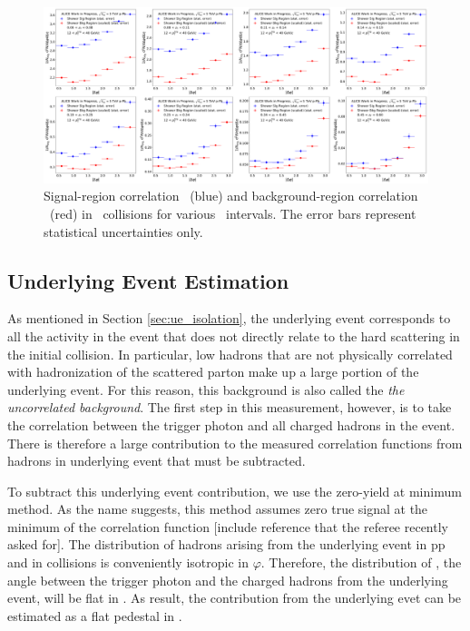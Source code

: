 \begin{figure}
    \centering
    \includegraphics[width = 1.0 \textwidth]{G-H_New/p-Pb_SR_BR_Overlay_pT_0.pdf}
    \caption{Signal-region correlation \CSR~(blue) and background-region correlation \CBR~(red) in \pPb~collisions for various \zt~intervals. The error bars represent statistical uncertainties only.}
    \label{fig:pPb_SR_BR_Overlay_pPb}
\end{figure}
\FloatBarrier


\subsection{Underlying Event Estimation}
\label{sec:ue_subtraction}
As mentioned in Section \ref{sec:ue_isolation}, the underlying event corresponds to all the activity in the event that does not directly relate to the hard scattering in the initial collision. In particular, low \pt hadrons that are not physically correlated with hadronization of the scattered parton make up a large portion of the underlying event. For this reason, this background is also called the \textit{the uncorrelated background}. The first step in this measurement, however, is to take the correlation between the trigger photon and all charged hadrons in the event. There is therefore a large contribution to the measured correlation functions from hadrons in underlying event that must be subtracted.

To subtract this underlying event contribution, we use the zero-yield at minimum method. As the name suggests, this method assumes zero true signal at the minimum of the correlation function [include reference that the referee recently asked for]. The distribution of hadrons arising from the underlying event in pp and in \pPb collisions is conveniently isotropic in $\varphi$. Therefore, the distribution of \deltaphi, the angle between the trigger photon and the charged hadrons from the underlying event, will be flat in \deltaphi. As result, the contribution from the underlying evet can be estimated as a flat pedestal in \deltaphi.

